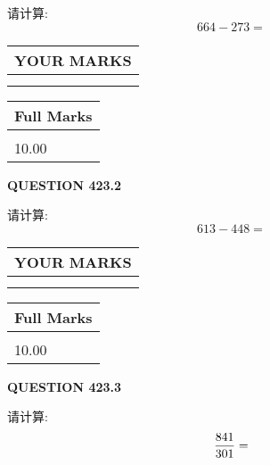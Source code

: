 \documentclass{ctexart}
\begin{document}
  
 
请计算:
\begin{equation}
664 -   %
273 = \nonumber
\end{equation}
 

 

 
  
\vspace{0.2in}
  
\noindent\begin{tabular}{|l|}
\hline
 YOUR MARKS  \\
\hline
 \\ 
 \\ 
\hline
\end{tabular}
\hspace{0.05in} \begin{tabular}{|l|}
\hline
 Full Marks  \\
\hline
 \\ 
10.00 \\
\hline
\end{tabular}
{\textbf{\Large{QUESTION
423.2 
}}}
  
  
 
请计算:
\begin{equation}
613 -   %
448 = \nonumber
\end{equation}
 

 

 
  
\vspace{0.2in}
  
\noindent\begin{tabular}{|l|}
\hline
 YOUR MARKS  \\
\hline
 \\ 
 \\ 
\hline
\end{tabular}
\hspace{0.05in} \begin{tabular}{|l|}
\hline
 Full Marks  \\
\hline
 \\ 
10.00 \\
\hline
\end{tabular}
{\textbf{\Large{QUESTION
423.3 
}}}
  
  
 
请计算:
\begin{equation}
\frac { %
841 }  {  %
301} = \nonumber
\end{equation}
 

 

 
  
\end{document}
